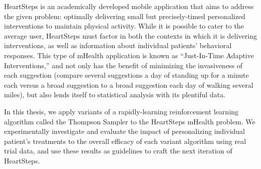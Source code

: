 HeartSteps is an academically developed mobile application that aims to address the given problem: optimally delivering small but precisely-timed personalized interventions to maintain physical activity.  While it is possible to cater to the average user, HeartSteps must factor in both the contexts in which it is delivering interventions, as well as information about individual patients' behavioral responses. This type of mHealth application is known as ``Just-In-Time Adaptive Interventions,'' and not only has the benefit of minimizing the invasiveness of each suggestion (compare several suggestions a day of standing up for a minute each versus a broad suggestion to a broad suggestion each day of walking several miles), but also lends itself to statistical analysis with its plentiful data.  

In this thesis, we apply variants of a rapidly-learning reinforcement learning algorithm called the Thompson Sampler to the HeartSteps mHealth problem.  We experimentally investigate and evaluate the impact of personalizing individual patient's treatments to the overall efficacy of each variant algorithm using real trial data, and use these results as guidelines to craft the next iteration of HeartSteps.



